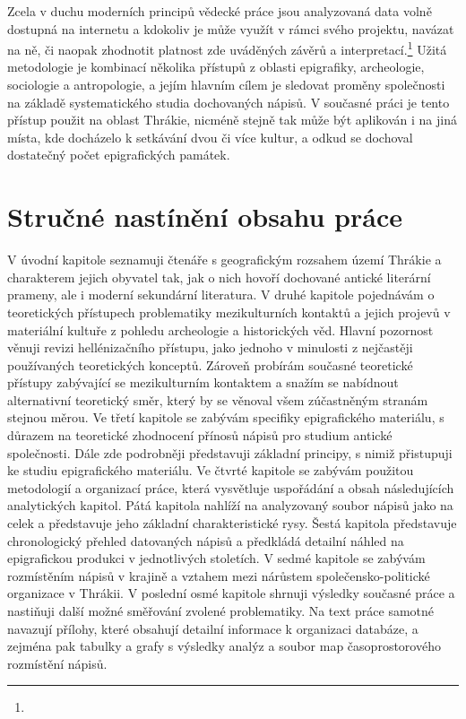 Zcela v duchu moderních principů vědecké práce jsou analyzovaná data volně dostupná na internetu a kdokoliv je může využít v rámci svého projektu, navázat na ně, či naopak zhodnotit platnost zde uváděných závěrů a interpretací.\footnote{\from[url1]} Užitá metodologie je kombinací několika přístupů z oblasti epigrafiky, archeologie, sociologie a antropologie, a jejím hlavním cílem je sledovat proměny společnosti na základě systematického studia dochovaných nápisů. V současné práci je tento přístup použit na oblast Thrákie, nicméně stejně tak může být aplikován i na jiná místa, kde docházelo k setkávání dvou či více kultur, a odkud se dochoval dostatečný počet epigrafických památek.

\section[stručné-nastínění-obsahu-práce]{Stručné nastínění obsahu práce}

V úvodní kapitole seznamuji čtenáře s geografickým rozsahem území Thrákie a charakterem jejich obyvatel tak, jak o nich hovoří dochované antické literární prameny, ale i moderní sekundární literatura. V druhé kapitole pojednávám o teoretických přístupech problematiky mezikulturních kontaktů a jejich projevů v materiální kultuře z pohledu archeologie a historických věd. Hlavní pozornost věnuji revizi hellénizačního přístupu, jako jednoho v minulosti z nejčastěji používaných teoretických konceptů. Zároveň probírám současné teoretické přístupy zabývající se mezikulturním kontaktem a snažím se nabídnout alternativní teoretický směr, který by se věnoval všem zúčastněným stranám stejnou měrou. Ve třetí kapitole se zabývám specifiky epigrafického materiálu, s důrazem na teoretické zhodnocení přínosů nápisů pro studium antické společnosti. Dále zde podrobněji představuji základní principy, s nimiž přistupuji ke studiu epigrafického materiálu. Ve čtvrté kapitole se zabývám použitou metodologií a organizací práce, která vysvětluje uspořádání a obsah následujících analytických kapitol. Pátá kapitola nahlíží na analyzovaný soubor nápisů jako na celek a představuje jeho základní charakteristické rysy. Šestá kapitola představuje chronologický přehled datovaných nápisů a předkládá detailní náhled na epigrafickou produkci v jednotlivých stoletích. V sedmé kapitole se zabývám rozmístěním nápisů v krajině a vztahem mezi nárůstem společensko-politické organizace v Thrákii. V poslední osmé kapitole shrnuji výsledky současné práce a nastiňuji další možné směřování zvolené problematiky. Na text práce samotné navazují přílohy, které obsahují detailní informace k organizaci databáze, a zejména pak tabulky a grafy s výsledky analýz a soubor map časoprostorového rozmístění nápisů.

